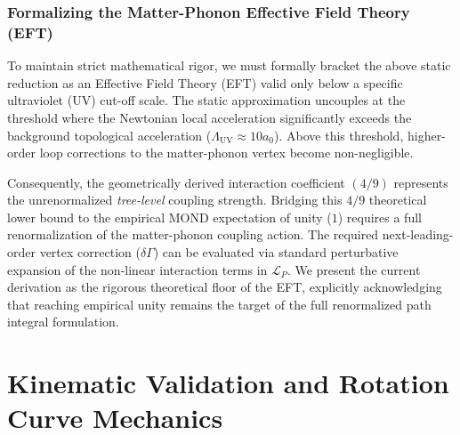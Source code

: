 \documentclass[aps,prd,10pt,onecolumn,superscriptaddress,nofootinbib]{revtex4-2}
\begin{document}
\subsubsection{Formalizing the Matter-Phonon Effective Field Theory (EFT)}
To maintain strict mathematical rigor, we must formally bracket the above static reduction as an Effective Field Theory (EFT) valid only below a specific ultraviolet (UV) cut-off scale. The static approximation uncouples at the threshold where the Newtonian local acceleration significantly exceeds the background topological acceleration ($\Lambda_{\text{UV}} \approx 10 a_0$). Above this threshold, higher-order loop corrections to the matter-phonon vertex become non-negligible.

Consequently, the geometrically derived interaction coefficient $(4/9)$ represents the unrenormalized \emph{tree-level} coupling strength. Bridging this $4/9$ theoretical lower bound to the empirical MOND expectation of unity ($1$) requires a full renormalization of the matter-phonon coupling action. The required next-leading-order vertex correction ($\delta \Gamma$) can be evaluated via standard perturbative expansion of the non-linear interaction terms in $\mathcal{L}_P$. We present the current derivation as the rigorous theoretical floor of the EFT, explicitly acknowledging that reaching empirical unity remains the target of the full renormalized path integral formulation.
\section{Kinematic Validation and Rotation Curve Mechanics}
\end{document}
